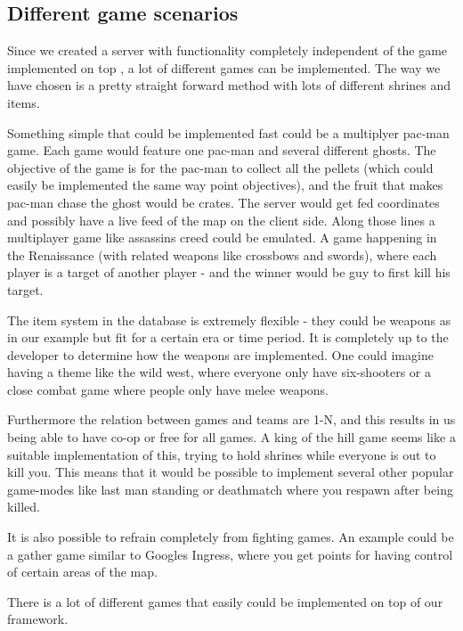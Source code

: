 \subsection{Different game scenarios}\label{subsec:game-scenarios}
Since we created a server with functionality completely independent of the game implemented on top , a lot of different games can be implemented. The way we have chosen is a pretty straight forward method with lots of different shrines and items.

Something simple that could be implemented fast could be a multiplyer pac-man game. Each game would feature one pac-man and several different ghosts. The objective of the game is for the pac-man to collect all the pellets (which could easily be implemented the same way point objectives), and the fruit that makes pac-man chase the ghost would be crates. The server would get fed coordinates and possibly have a live feed of the map on the client side.
Along those lines a multiplayer game like assassins creed could be emulated. A game happening in the Renaissance (with related weapons like crossbows and swords), where each player is a target of another player - and the winner would be guy to first kill his target.

The item system in the database is extremely flexible - they could be weapons as in our example but fit for a certain era or time period. It is completely up to the developer to determine how the weapons are implemented. One could imagine having a theme like the wild west, where everyone only have six-shooters or a close combat game where people only have melee weapons. 

Furthermore the relation between games and teams are 1-N, and this results in us being able to have co-op or free for all games. A king of the hill game seems like a suitable implementation of this, trying to hold shrines while everyone is out to kill you. This means that it would be possible to implement several other popular game-modes like last man standing or deathmatch where you respawn after being killed.

It is also possible to refrain completely from fighting games. An example could be a gather game similar to Googles Ingress, where you get points for having control of certain areas of the map.

There is a lot of different games that easily could be implemented on top of our framework.


